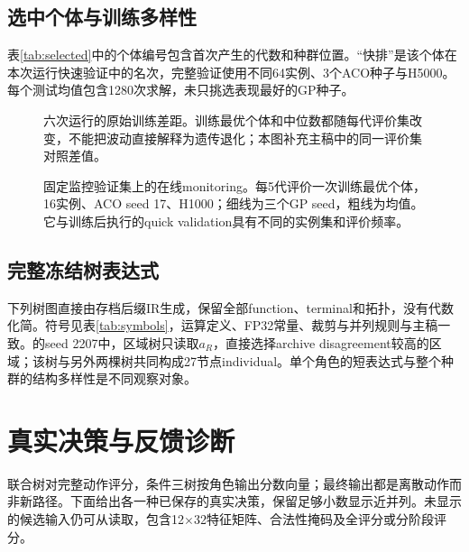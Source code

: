 \documentclass[runningheads,orivec]{llncs}
\begin{document}
\subsection{选中个体与训练多样性}
表\ref{tab:selected}中的个体编号包含首次产生的代数和种群位置。“快排”是该个体在本次运行快速验证中的名次，完整验证使用不同64实例、3个ACO种子与H5000。每个测试均值包含1280次求解，未只挑选表现最好的GP种子。
\begin{table}[htbp]\caption{六个冻结个体。验证和测试列均为参考差距（\%）。}\label{tab:selected}
\centering\small{}\end{table}
\begin{table}[htbp]\caption{第50代种群多样性。程序、行为和适应度列为不同值的数量；高度是每个个体最大树高的中位数。}\label{tab:diversity}
\centering\small{}\end{table}
\begin{figure}[htbp]\centering{}
\caption{六次运行的原始训练差距。训练最优个体和中位数都随每代评价集改变，不能把波动直接解释为遗传退化；本图补充主稿中的同一评价集对照差值。}\end{figure}
\begin{figure}[htbp]\centering{}
\caption{固定监控验证集上的在线monitoring。每5代评价一次训练最优个体，16实例、ACO seed 17、H1000；细线为三个GP seed，粗线为均值。它与训练后执行的quick validation具有不同的实例集和评价频率。}\end{figure}

\subsection{完整冻结树表达式}
下列树图直接由存档后缀IR生成，保留全部function、terminal和拓扑，没有代数化简。符号见表\ref{tab:symbols}，运算定义、FP32常量、裁剪与并列规则与主稿一致。\CT{}的seed 2207中，区域树只读取$a_R$，直接选择archive disagreement较高的区域；该树与另外两棵树共同构成27节点individual。单个角色的短表达式与整个种群的结构多样性是不同观察对象。

\section{真实决策与反馈诊断}
联合树对完整动作评分，条件三树按角色输出分数向量；最终输出都是离散动作而非新路径。下面给出各一种已保存的真实决策，保留足够小数显示近并列。未显示的候选输入仍可从读取，包含12$\times$32特征矩阵、合法性掩码及全评分或分阶段评分。
\end{document}
